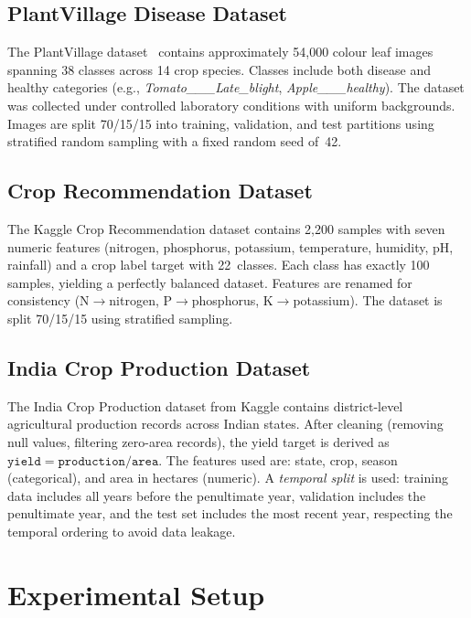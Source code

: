 \documentclass[conference]{IEEEtran}
\begin{document}
\subsection{PlantVillage Disease Dataset}
The PlantVillage dataset~\cite{hughes2015open} contains approximately 54,000 colour leaf images spanning 38 classes across 14 crop species. Classes include both disease and healthy categories (e.g., \textit{Tomato\_\_\_Late\_blight}, \textit{Apple\_\_\_healthy}). The dataset was collected under controlled laboratory conditions with uniform backgrounds. Images are split 70/15/15 into training, validation, and test partitions using stratified random sampling with a fixed random seed of~42.

\subsection{Crop Recommendation Dataset}
The Kaggle Crop Recommendation dataset contains 2,200 samples with seven numeric features (nitrogen, phosphorus, potassium, temperature, humidity, pH, rainfall) and a crop label target with 22~classes. Each class has exactly 100 samples, yielding a perfectly balanced dataset. Features are renamed for consistency (N$\to$nitrogen, P$\to$phosphorus, K$\to$potassium). The dataset is split 70/15/15 using stratified sampling.

\subsection{India Crop Production Dataset}
The India Crop Production dataset from Kaggle contains district-level agricultural production records across Indian states. After cleaning (removing null values, filtering zero-area records), the yield target is derived as $\texttt{yield} = \texttt{production} / \texttt{area}$. The features used are: state, crop, season (categorical), and area in hectares (numeric). A \emph{temporal split} is used: training data includes all years before the penultimate year, validation includes the penultimate year, and the test set includes the most recent year, respecting the temporal ordering to avoid data leakage.


\section{Experimental Setup}
\label{sec:experiments}
\end{document}
